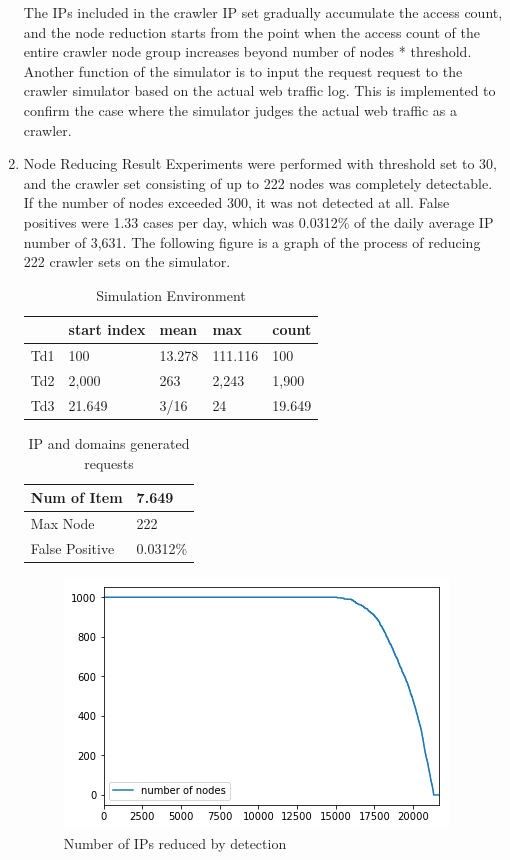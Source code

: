 \documentclass[sigconf,anonymous=false]{acmart}
\begin{document}
\begin{enumerate}
The IPs included in the crawler IP set gradually accumulate the access count, and the node reduction starts from the point when the access count of the entire crawler node group increases beyond {number of nodes} * {threshold}.
Another function of the simulator is to input the request request to the crawler simulator based on the actual web traffic log. This is implemented to confirm the case where the simulator judges the actual web traffic as a crawler.
\newline
\item Node Reducing Result
\newline 
Experiments were performed with threshold set to 30, and the crawler set consisting of up to 222 nodes was completely detectable. If the number of nodes exceeded 300, it was not detected at all. False positives were 1.33 cases per day, which was 0.0312\% of the daily average IP number of 3,631. The following figure is a graph of the process of reducing 222 crawler sets on the simulator.


\begin{table}[H]
  \caption{Simulation Environment}
    \begin{tabular}{| l | l | l | l | l | }
    \hline
    & start index & mean & max & count \\ \hline
    Td1 & 100 & 13.278 & 111.116 & 100 \\ 
    Td2 & 2,000 & 263 & 2,243 & 1,900 \\
    Td3 & 21.649 & 3/16 & 24 & 19.649 \\ \hline
    \end{tabular}
\end{table}


\begin{table}[H]
  \caption{IP and domains generated requests}
  \label{tab:freq}
    \begin{tabular}{| p{2cm} | p{2cm} |}
    \hline
    Num of Item & 7.649 \\ \hline
    Max Node & 222 \\ \hline
    False Positive & 0.0312\%  \\ \hline
    \end{tabular}
\end{table}

\begin{figure}[H]
    \centering
    \includegraphics[width=0.7\columnwidth]{figs/figure_06_nr.png}
    \caption{Number of IPs reduced by detection}
    \label{fig:my_label}
\end{figure}


\end{enumerate}
\end{document}
